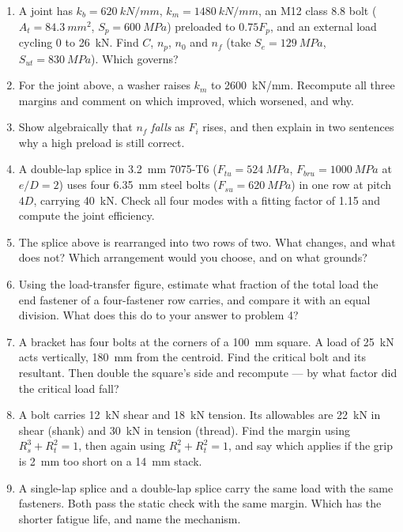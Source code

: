 \documentclass[11pt,a4paper]{article}
\begin{document}
\begin{enumerate}[nosep,leftmargin=1.5em]
  \item A joint has $k_b=\SI{620}{kN/mm}$, $k_m=\SI{1480}{kN/mm}$, an M12 class 8.8 bolt
        ($A_t=\SI{84.3}{mm^2}$, $S_p=\SI{600}{MPa}$) preloaded to $0.75F_p$, and an external load
        cycling $0$ to \SI{26}{kN}. Find $C$, $n_p$, $n_0$ and $n_f$ (take $S_e=\SI{129}{MPa}$,
        $S_{ut}=\SI{830}{MPa}$). Which governs?
  \item For the joint above, a washer raises $k_m$ to \SI{2600}{kN/mm}. Recompute all three margins
        and comment on which improved, which worsened, and why.
  \item Show algebraically that $n_f$ \emph{falls} as $F_i$ rises, and then explain in two sentences
        why a high preload is still correct.
  \item A double-lap splice in \SI{3.2}{mm} 7075-T6 ($F_{tu}=\SI{524}{MPa}$,
        $F_{bru}=\SI{1000}{MPa}$ at $e/D=2$) uses four \SI{6.35}{mm} steel bolts
        ($F_{su}=\SI{620}{MPa}$) in one row at pitch $4D$, carrying \SI{40}{kN}. Check all four
        modes with a fitting factor of 1.15 and compute the joint efficiency.
  \item The splice above is rearranged into two rows of two. What changes, and what does not? Which
        arrangement would you choose, and on what grounds?
  \item Using the load-transfer figure, estimate what fraction of the total load the end fastener of
        a four-fastener row carries, and compare it with an equal division. What does this do to your
        answer to problem 4?
  \item A bracket has four bolts at the corners of a \SI{100}{mm} square. A load of \SI{25}{kN} acts
        vertically, \SI{180}{mm} from the centroid. Find the critical bolt and its resultant. Then
        double the square's side and recompute --- by what factor did the critical load fall?
  \item A bolt carries \SI{12}{kN} shear and \SI{18}{kN} tension. Its allowables are \SI{22}{kN} in
        shear (shank) and \SI{30}{kN} in tension (thread). Find the margin using
        $R_s^3+R_t^2=1$, then again using $R_s^2+R_t^2=1$, and say which applies if the grip is
        \SI{2}{mm} too short on a \SI{14}{mm} stack.
  \item A single-lap splice and a double-lap splice carry the same load with the same fasteners.
        Both pass the static check with the same margin. Which has the shorter fatigue life, and
        name the mechanism.
\end{enumerate}
\end{document}
